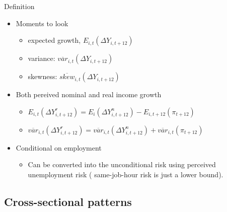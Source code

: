 \documentclass{beamer}
\begin{document}
\begin{frame}{Definition}
	\begin{itemize}
		\item Moments to look
		\begin{itemize}
			\item expected growth, $E_{i,t} (\Delta Y_{i,t+12})$
			\item variance: $\overline {var}_{i,t}(\Delta Y_{i,t+12})$
			\item skewness: $\overline {skew}_{i,t}(\Delta Y_{i,t+12})$
		\end{itemize}
		\item Both pereived nominal and real income growth 
		\begin{itemize}
			\item $E_{i,t}(\Delta Y^r_{i,t+12}) =E_i(\Delta Y_{i,t+12}^n) - E_{i,t+12}(\pi_{t+12})$
			\item $\overline{var}_{i,t}(\Delta Y_{i,t+12}^r) =\overline {var}_{i,t}(\Delta Y_{i,t+12}^n) +  \overline {var}_{i,t}(\pi_{t+12})$
		\end{itemize}
		\item Conditional on employment
		\begin{itemize}
			\item Can be converted into the unconditional risk using perceived unemployment risk ( same-job-hour risk is just a lower bound).  %
		\end{itemize}
	\end{itemize}
\end{frame}

\subsection{Cross-sectional patterns}

\end{document}
